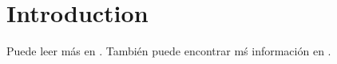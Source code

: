 \documentclass{article}
\begin{document}
\section{Introduction}

Puede leer m\'as en \cite{Moyano_2018}. Tambi\'en puede encontrar m\'s informaci\'on en \cite{Moyano_2016, Herrera_2016, Tsoumakas_2010}.



\end{document}
